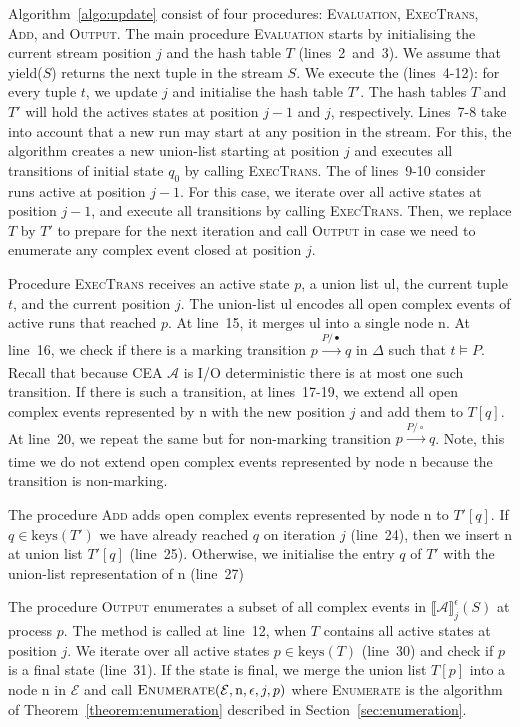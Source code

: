 Algorithm~\ref{algo:update} consist of four procedures: \textsc{Evaluation}, \textsc{ExecTrans}, \textsc{Add}, and \textsc{Output}. The main procedure \textsc{Evaluation} starts by initialising the current stream position $j$ and the hash table $T$ (lines~2~and~3). We assume that yield($S$) returns the next tuple in the stream $S$. We execute the  (lines~4-12): for every tuple $t$, we update $j$ and initialise the hash table $T'$. The hash tables $T$ and $T'$ will hold the actives states at position $j-1$ and $j$, respectively. Lines~7-8 take into account that a new run may start at any position in the stream. For this, the algorithm creates a new union-list starting at position $j$ and executes all transitions of initial state $q_{0}$ by calling \textsc{ExecTrans}. The  of lines~9-10 consider runs active at position $j-1$. For this case, we iterate over all active states at position $j-1$, and execute all transitions by calling \textsc{ExecTrans}. Then, we replace $T$ by $T'$ to prepare for the next iteration and call \textsc{Output} in case we need to enumerate any complex event closed at position $j$.

Procedure \textsc{ExecTrans} receives an active state $p$, a union list \textrm{ul}, the current tuple $t$, and the current position $j$. The union-list \textrm{ul} encodes all open complex events of active runs that reached $p$. At line~15, it merges \textrm{ul} into a single node \textrm{n}. At line~16, we check if there is a marking transition $p \xrightarrow[]{P/\bullet} q$ in $\Delta$ such that $t \vDash P$. Recall that because CEA $\mathcal{A}$ is I/O deterministic there is at most one such transition. If there is such a transition, at lines~17-19, we extend all open complex events represented by \textrm{n} with the new position $j$ and add them to $T[q]$. At line~20, we repeat the same but for non-marking transition $p \xrightarrow[]{P/\circ} q$. Note, this time we do not extend open complex events represented by node \textrm{n} because the transition is non-marking.

The procedure \textsc{Add} adds open complex events represented by node \textrm{n} to $T'[q]$. If $q \in \text{keys}(T')$ we have already reached $q$ on iteration $j$ (line~24), then we insert \textrm{n} at union list $T'[q]$ (line~25). Otherwise,  we initialise the entry $q$ of $T'$ with the union-list representation of \textrm{n} (line~27)

The procedure \textsc{Output} enumerates a subset of all complex events in ${\llbracket \mathcal{A} \rrbracket}^{\epsilon}_{j}(S)$ at process $p$. The method is called at line~12, when $T$ contains all active states at position $j$. We iterate over all active states $p \in \text{keys}(T)$ (line~30) and check if $p$ is a final state (line~31). If the state is final, we merge the union list $T[p]$ into a node \textrm{n} in $\mathcal{E}$ and call $\textsc{Enumerate}(\mathcal{E}, \textrm{n}, \epsilon, j, p)$ where \textsc{Enumerate} is the algorithm of Theorem~\ref{theorem:enumeration} described in Section~\ref{sec:enumeration}.

